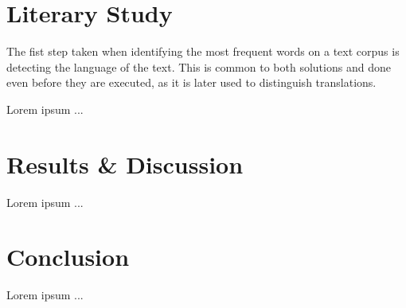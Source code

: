 \documentclass[shortpaper]{revdetua}
\begin{document}

\section{Literary Study}

The fist step taken when identifying the most frequent words on a text corpus is detecting the language of the text.
This is common to both solutions and done even before they are executed, as it is later used to distinguish translations.

Lorem ipsum ...



\section{Results \& Discussion}

Lorem ipsum ...




\section{Conclusion}

Lorem ipsum ...


 

\end{document}
